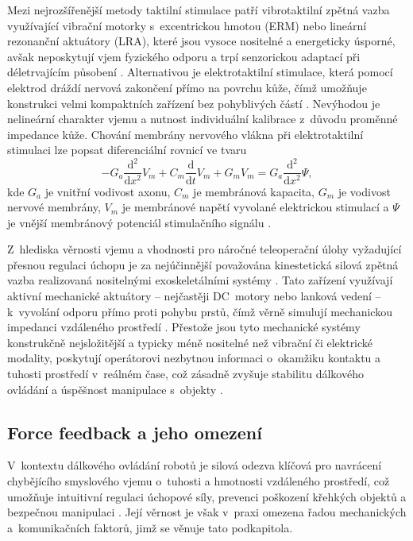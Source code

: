 \documentclass[FZS,DP]{tulthesis}
\begin{document}
Mezi nejrozšířenější metody taktilní stimulace patří vibrotaktilní zpětná vazba využívající vibrační motorky s~excentrickou hmotou (ERM) nebo lineární rezonanční aktuátory (LRA), které jsou vysoce nositelné a energeticky úsporné, avšak neposkytují vjem fyzického odporu a trpí senzorickou adaptací při déletrvajícím působení \cite{Kourtesis202271, Park2022, Thomas2023110}.
Alternativou je elektrotaktilní stimulace, která pomocí elektrod dráždí nervová zakončení přímo na povrchu kůže, čímž umožňuje konstrukci velmi kompaktních zařízení bez pohyblivých částí \cite{Kourtesis202271, Yang2025}.
Nevýhodou je nelineární charakter vjemu a nutnost individuální kalibrace z~důvodu proměnné impedance kůže.
Chování membrány nervového vlákna při elektrotaktilní stimulaci lze popsat diferenciální rovnicí ve tvaru
%
\begin{equation}
    -G_a \frac{\mathrm{d}^2}{\mathrm{d}x^2} V_m
    + C_m \frac{\mathrm{d}}{\mathrm{d}t} V_m
    + G_m V_m
    = G_a \frac{\mathrm{d}^2}{\mathrm{d}x^2} \Psi,
\end{equation}
kde $G_a$ je vnitřní vodivost axonu, $C_m$ je membránová kapacita,
$G_m$ je vodivost nervové membrány, $V_m$ je membránové napětí
vyvolané elektrickou stimulací a $\Psi$ je vnější membránový potenciál
stimulačního signálu \cite{Yang2025}.

Z~hlediska věrnosti vjemu a vhodnosti pro náročné teleoperační úlohy vyžadující přesnou regulaci úchopu je za nejúčinnější považována kinestetická silová zpětná vazba realizovaná nositelnými exoskeletálními systémy \cite{Li2025, GIUDICI2025, Giudici2024}.
Tato zařízení využívají aktivní mechanické aktuátory -- nejčastěji DC~motory nebo lanková vedení -- k~vyvolání odporu přímo proti pohybu prstů, čímž věrně simulují mechanickou impedanci vzdáleného prostředí \cite{Li2025, GIUDICI2025}.
Přestože jsou tyto mechanické systémy konstrukčně nejsložitější a typicky méně nositelné než vibrační či elektrické modality, poskytují operátorovi nezbytnou informaci o~okamžiku kontaktu a tuhosti prostředí v~reálném čase, což zásadně zvyšuje stabilitu dálkového ovládání a úspěšnost manipulace s~objekty \cite{Li2025, Park2022, Giudici2024}.
\subsection{Force feedback a jeho omezení}
V~kontextu dálkového ovládání robotů je silová odezva klíčová pro navrácení chybějícího smyslového vjemu o~tuhosti a hmotnosti vzdáleného prostředí, což umožňuje intuitivní regulaci úchopové síly, prevenci poškození křehkých objektů a bezpečnou manipulaci \cite{GIUDICI2025, Patel2022, Park2022}. Její věrnost je však v~praxi omezena řadou mechanických a~komunikačních faktorů, jimž se věnuje tato podkapitola.
\end{document}
